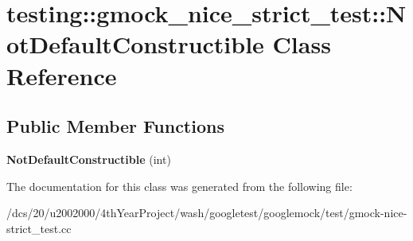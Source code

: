 \hypertarget{classtesting_1_1gmock__nice__strict__test_1_1NotDefaultConstructible}{}\section{testing\+:\+:gmock\+\_\+nice\+\_\+strict\+\_\+test\+:\+:Not\+Default\+Constructible Class Reference}
\label{classtesting_1_1gmock__nice__strict__test_1_1NotDefaultConstructible}
\subsection*{Public Member Functions}
\begin{DoxyCompactItemize}
\item 
\mbox{\label{classtesting_1_1gmock__nice__strict__test_1_1NotDefaultConstructible_acfaca2e03925805192b698708d6030bc}} 
{\bfseries Not\+Default\+Constructible} (int)
\end{DoxyCompactItemize}


The documentation for this class was generated from the following file\+:\begin{DoxyCompactItemize}
\item 
/dcs/20/u2002000/4th\+Year\+Project/wash/googletest/googlemock/test/gmock-\/nice-\/strict\+\_\+test.\+cc\end{DoxyCompactItemize}
